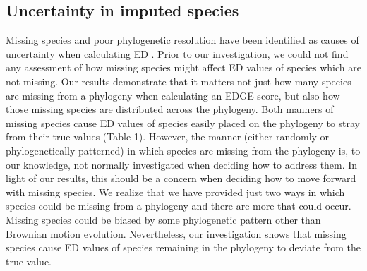\documentclass[12pt,english]{article}
\begin{document}

\subsection*{Uncertainty in imputed species}
Missing species and poor phylogenetic resolution have been identified as causes
of uncertainty when calculating ED \autocite{Isaac2007}. Prior to our
investigation, we could not find any assessment of how missing species might
affect ED values of species which are not missing.
Our results demonstrate that it matters not just how many species are missing
from a phylogeny when calculating an EDGE score, but also how those missing
species are distributed across the phylogeny.
Both manners of missing species cause ED values of species easily
placed on the phylogeny to stray from their true values (Table
1).
However, the manner (either randomly or phylogenetically-patterned) in which
species are missing from the phylogeny is, to our knowledge, not normally
investigated when deciding how to address them. In light of our results, this
should be a concern when deciding how to move forward with missing species.
We realize that we have provided just two ways in which species could be missing
from a phylogeny and there are more that could occur. Missing species could be
biased by some phylogenetic pattern other than Brownian motion evolution.
Nevertheless, our investigation shows that missing species cause ED values of
species remaining in the phylogeny to deviate from the true value.
\end{document}
